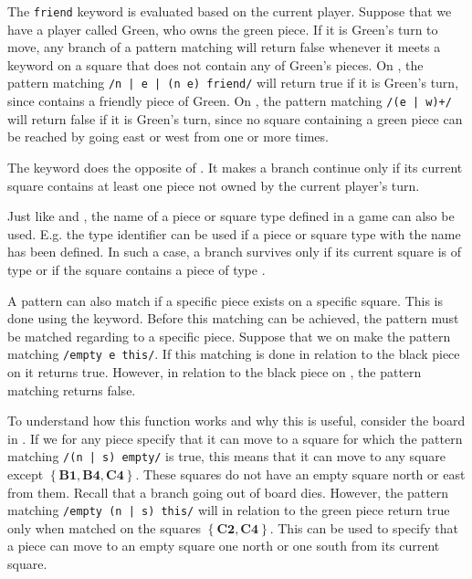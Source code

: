 The \texttt{friend} keyword is evaluated based on the current player. Suppose
that we have a player called Green, who owns the green piece. If it is Green's
turn to move, any branch of a pattern matching will return false whenever it
meets a keyword  on a square that does not contain any of Green's
pieces. On , the pattern matching \texttt{/n | e | (n e) friend/}
will return true if it is Green's turn, since  contains a friendly
piece of Green. On , the pattern matching \texttt{/(e | w)+/} will
return false if it is Green's turn, since no square containing a green piece can
be reached by going east or west from  one or more times.

The  keyword does the opposite of . It makes a branch
continue only if its current square contains at least one piece not owned by the
current player's turn.

Just like  and , the name of a piece or square type
defined in a \productname{} game can also be used. E.g. the type identifier
 can be used if a piece or square type with the name has been
defined. In such a case, a branch survives only if its current square is of type
 or if the square contains a piece of type .

A pattern can also match if a specific piece exists on a specific square. This
is done using the  keyword. Before this matching can be achieved,
the pattern must be matched regarding to a specific piece. Suppose that we on
 make the pattern matching \texttt{/empty e this/}. If this matching
is done in relation to the black piece on  it returns true. However,
in relation to the black piece on , the pattern matching returns
false. 

To understand how this function works and why this is useful, consider
the board in . If we for any piece specify that it can
move to a square for which the pattern matching \texttt{/(n | s) empty/} is
true, this means that it can move to any square except $\mathbf{\left\{B1, B4,
C4\right\}}$. These squares do not have an empty square north or east from them.
Recall that a branch going out of board dies.  However, the pattern matching
\texttt{/empty (n | s) this/} will in relation to the green piece return true
only when matched on the squares $\mathbf{\left\{ C2, C4\right\}}$.  This can be
used to specify that a piece can move to an empty square one north or one south
from its current square. 

